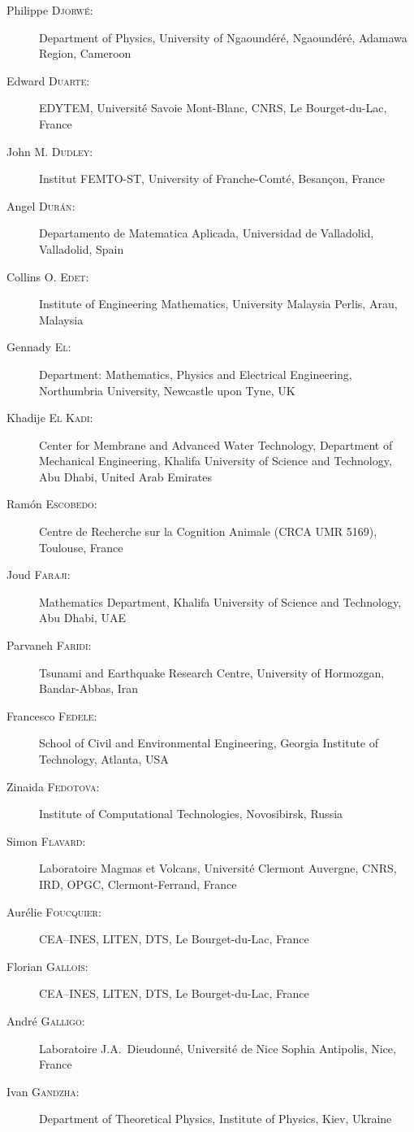 \begin{description}
  \item[Philippe \textsc{Djorw\'e}:] Department of Physics, University of Ngaound\'er\'e, Ngaoundéré, Adamawa Region, Cameroon
  \item[Edward \textsc{Duarte}:] EDYTEM, Universit\'e Savoie Mont-Blanc, CNRS, Le Bourget-du-Lac, France
  \item[John M. \textsc{Dudley}:] Institut FEMTO-ST, University of Franche-Comt\'e, Besan\c{c}on, France
  \item[Angel \textsc{Dur\'an}:] Departamento de Matematica Aplicada, Universidad de Valladolid, Valladolid, Spain
  \item[Collins O. \textsc{Edet}:] Institute of Engineering Mathematics, University Malaysia Perlis, Arau, Malaysia
  \item[Gennady \textsc{El}:] Department: Mathematics, Physics and Electrical Engineering, Northumbria University, Newcastle upon Tyne, UK
  \item[Khadije \textsc{El Kadi}:] Center for Membrane and Advanced Water Technology, Department of Mechanical Engineering, Khalifa University of Science and Technology, Abu Dhabi, United Arab Emirates
  \item[Ram\'on \textsc{Escobedo}:] Centre de Recherche sur la Cognition Animale (CRCA UMR 5169), Toulouse, France
  \item[Joud \textsc{Faraji}:] Mathematics Department, Khalifa University of Science and Technology, Abu Dhabi, UAE
  \item[Parvaneh \textsc{Faridi}:] Tsunami and Earthquake Research Centre, University of Hormozgan, Bandar-Abbas, Iran
  \item[Francesco \textsc{Fedele}:] School of Civil and Environmental Engineering, Georgia Institute of Technology, Atlanta, USA
  \item[Zinaida \textsc{Fedotova}:] Institute of Computational Technologies, Novosibirsk, Russia
  \item[Simon \textsc{Flavard}:] Laboratoire Magmas et Volcans, Universit\'e Clermont Auvergne, CNRS, IRD, OPGC, Clermont-Ferrand, France
  \item[Aur\'elie \textsc{Foucquier}:] CEA--INES, LITEN, DTS, Le Bourget-du-Lac, France
  \item[Florian \textsc{Gallois}:] CEA--INES, LITEN, DTS, Le Bourget-du-Lac, France
  \item[Andr\'e \textsc{Galligo}:] Laboratoire J.A.~Dieudonn\'e, Universit\'e de Nice Sophia Antipolis, Nice, France
  \item[Ivan \textsc{Gandzha}:] Department of Theoretical Physics, Institute of Physics, Kiev, Ukraine

\end{description}
